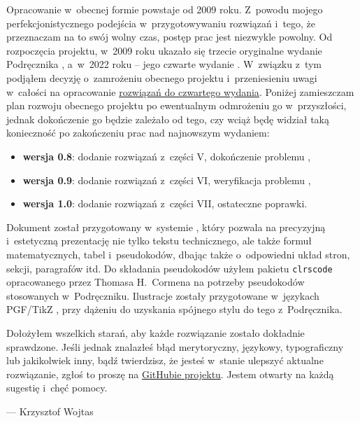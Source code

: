 Opracowanie w~obecnej formie powstaje od 2009 roku.
Z~powodu mojego perfekcjonistycznego podejścia w~przygotowywaniu rozwiązań i~tego, że przeznaczam na to swój wolny czas, postęp prac jest niezwykle powolny.
Od rozpoczęcia projektu, w~2009 roku ukazało się trzecie oryginalne wydanie Podręcznika \cite{clrs3}, a~w~2022 roku -- jego czwarte wydanie \cite{clrs4}.
W~związku z~tym podjąłem decyzję o~zamrożeniu obecnego projektu i~przeniesieniu uwagi w~całości na opracowanie \href{https://github.com/wojtask/clrs4e-solutions}{rozwiązań do czwartego wydania}.
Poniżej zamieszczam plan rozwoju obecnego projektu po ewentualnym odmrożeniu go w~przyszłości, jednak dokończenie go będzie zależało od tego, czy wciąż będę widział taką konieczność po zakończeniu prac nad najnowszym wydaniem:
\begin{itemize}
    \item \textbf{wersja 0.8}: dodanie rozwiązań z~części V, dokończenie problemu ,
    \item \textbf{wersja 0.9}: dodanie rozwiązań z~części VI, weryfikacja problemu ,
    \item \textbf{wersja 1.0}: dodanie rozwiązań z~części VII, ostateczne poprawki.
\end{itemize}

Dokument został przygotowany w~systemie \LaTeXe, który pozwala na precyzyjną i~estetyczną prezentację nie tylko tekstu technicznego, ale także formuł matematycznych, tabel i~pseudokodów, dbając także o~odpowiedni układ stron, sekcji, paragrafów itd.
Do składania pseudokodów użyłem pakietu \texttt{clrscode} opracowanego przez Thomasa H.\ Cormena na potrzeby pseudokodów stosowanych w~Podręczniku.
Ilustracje zostały przygotowane w~językach PGF/TikZ \cite{pgfmanual}, przy dążeniu do uzyskania spójnego stylu do tego z~Podręcznika.

Dołożyłem wszelkich starań, aby każde rozwiązanie zostało dokładnie sprawdzone.
Jeśli jednak znalazłeś błąd merytoryczny, językowy, typograficzny lub jakikolwiek inny, bądź twierdzisz, że jesteś w~stanie ulepszyć aktualne rozwiązanie, zgłoś to proszę na \href{https://github.com/wojtask/CormenSol/issues/new}{GitHubie projektu}.
Jestem otwarty na każdą sugestię i~chęć pomocy.

\bigskip
\bigskip
{}\hfill--- Krzysztof Wojtas
